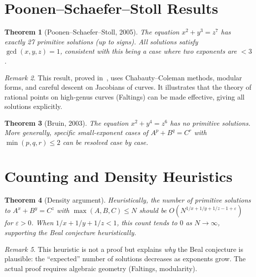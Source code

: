 \documentclass[12pt,a4paper]{amsart}
\newtheorem{theorem}{Theorem}[section]
\theoremstyle{definition}
\theoremstyle{remark}
\newtheorem{remark}[theorem]{Remark}
\begin{document}
\section{Poonen--Schaefer--Stoll Results}

\begin{theorem}[Poonen--Schaefer--Stoll, 2005]\label{thm:PSS}
The equation $x^2 + y^3 = z^7$ has exactly 27 primitive solutions (up to signs).
All solutions satisfy $\gcd(x,y,z) = 1$, consistent with this being a case where
two exponents are $< 3$.
\end{theorem}

\begin{remark}
This result, proved in~\cite{PSS07}, uses Chabauty--Coleman methods, modular
forms, and careful descent on Jacobians of curves. It illustrates that the
theory of rational points on high-genus curves (Faltings) can be made effective,
giving all solutions explicitly.
\end{remark}

\begin{theorem}[Bruin, 2003]\label{thm:bruin}
The equation $x^2 + y^4 = z^6$ has no primitive solutions. More generally,
specific small-exponent cases of $A^p + B^q = C^r$ with $\min(p,q,r) \leq 2$
can be resolved case by case.
\end{theorem}

\section{Counting and Density Heuristics}

\begin{theorem}[Density argument]\label{thm:density}
Heuristically, the number of primitive solutions to $A^x + B^y = C^z$ with
$\max(A,B,C) \leq N$ should be $O(N^{1/x + 1/y + 1/z - 1 + \varepsilon})$ for
$\varepsilon > 0$. When $1/x + 1/y + 1/z < 1$, this count tends to $0$ as
$N \to \infty$, supporting the Beal conjecture heuristically.
\end{theorem}

\begin{remark}
This heuristic is not a proof but explains \emph{why} the Beal conjecture is
plausible: the ``expected'' number of solutions decreases as exponents grow.
The actual proof requires algebraic geometry (Faltings, modularity).
\end{remark}
\end{document}
